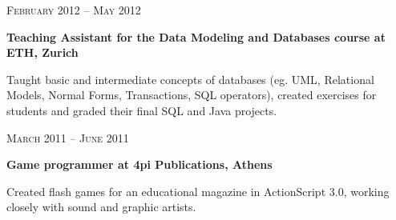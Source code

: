 \documentclass[10pt]{article} %
\begin{document}
\begin{minipage}[t]{0.5\textwidth}
{\raggedleft\textsc{February 2012 -- May 2012}\par}

{\raggedright\large \textbf{Teaching Assistant for the Data Modeling and Databases course at ETH, Zurich}\\}

\normalsize{Taught basic and intermediate concepts of databases (eg. UML, Relational Models, Normal Forms, Transactions, SQL operators), created exercises for students and graded their final SQL and Java projects.}\\


{\raggedleft\textsc{March 2011 -- June 2011}\par}

{\raggedright\large \textbf{Game programmer at 4pi Publications, Athens}\\}

\normalsize{Created flash games for an educational magazine in ActionScript 3.0, working closely with sound and graphic artists.}\\


	

\end{minipage} %
\hfill
\end{document}
